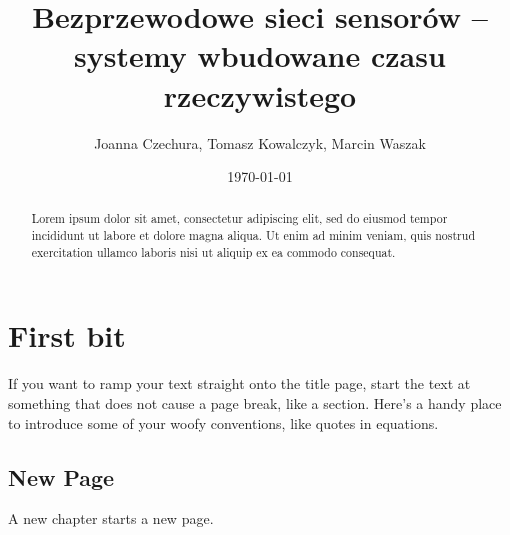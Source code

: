 \documentclass[12pt, twoside, hidelinks, a4paper]{article}
\begin{document}

\author{Joanna Czechura, Tomasz Kowalczyk, Marcin Waszak}
\title{Bezprzewodowe sieci sensorów – systemy wbudowane czasu rzeczywistego}
\date{\today}


\maketitle
    

\begin{abstract}
Lorem ipsum dolor sit amet, consectetur adipiscing elit, sed do eiusmod tempor incididunt ut labore et dolore magna aliqua. Ut enim ad minim veniam, quis nostrud exercitation ullamco laboris nisi ut aliquip ex ea commodo consequat. 
\end{abstract}
\section{First bit}
If you want to ramp your text straight onto the title page, start the text at 
something that does not cause a page break, like a section.  Here's a handy 
place to introduce some of your woofy conventions, like quotes in equations.
\subsection{New Page}
A new chapter starts a new page. \cite{przepior}

    \printbibliography
\end{document}

